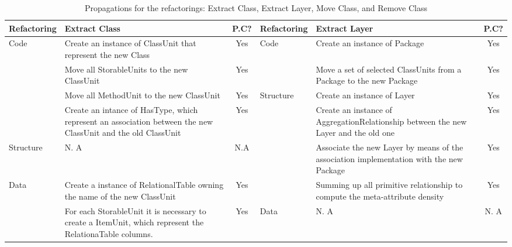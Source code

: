 \begin{table}
\centering
\caption{Propagations for the refactorings: Extract Class, Extract Layer, Move Class, and Remove Class\label{tab:prop}}
{\footnotesize{}}%
\setlength{\tabcolsep}{0.0em}
{\renewcommand{\arraystretch}{0.5}
\begin{tabular}{|l|>{\raggedright}p{7cm}|c|l|>{\raggedright}p{7cm}|c|}
\hline 
\textbf{\footnotesize{\cellcolor{gray!40}Refactoring}} & \textbf{\footnotesize{\cellcolor{gray!40}Extract Class}} & \textbf{\footnotesize{\cellcolor{gray!40}P.C?}} & \textbf{\footnotesize{\cellcolor{gray!40}Refactoring}} & \textbf{\footnotesize{\cellcolor{gray!40}Extract Layer}} & \textbf{\footnotesize{\cellcolor{gray!40}P.C?}}\tabularnewline
\hline 
\hline 
\multirow{4}{*}{{\footnotesize{Code}}} & {\footnotesize{Create an instance of ClassUnit that represent the
new Class}} & {\footnotesize{Yes}} & \multirow{2}{*}{{\footnotesize{Code}}} & {\footnotesize{Create an instance of Package}} & {\footnotesize{Yes}}\tabularnewline
\cline{2-3} \cline{5-6} 
 & {\footnotesize{Move all StorableUnits to the new ClassUnit}} & {\footnotesize{Yes}} &  & {\footnotesize{Move a set of selected ClassUnits from a Package to the
new Package}} & {\footnotesize{Yes}}\tabularnewline
\cline{2-6} 
 & {\footnotesize{Move all MethodUnit to the new ClassUnit}} & {\footnotesize{Yes}} & \multirow{4}{*}{{\footnotesize{Structure}}} & {\footnotesize{Create an instance of Layer}} & {\footnotesize{Yes}}\tabularnewline
\cline{2-3} \cline{5-6} 
 & {\footnotesize{Create an intance of HasType, which represent an association
between the new ClassUnit and the old ClassUnit}} & {\footnotesize{Yes}} &  & {\footnotesize{Create an instance of AggregationRelationship between
the new Layer and the old one}} & {\footnotesize{Yes}}\tabularnewline
\cline{1-3} \cline{5-6} 
{\footnotesize{Structure }} & {\footnotesize{N. A}} & {\footnotesize{N.A}} &  & {\footnotesize{Associate the new Layer by means of the association
implementation with the new Package}} & {\footnotesize{Yes}}\tabularnewline
\cline{1-3} \cline{5-6} 
\multirow{3}{*}{{\footnotesize{Data }}} & {\footnotesize{Create a instance of RelationalTable owning the name
of the new ClassUnit}} & {\footnotesize{Yes}} &  & {\footnotesize{Summing up all primitive relationship to compute the
meta-attribute density}} & {\footnotesize{Yes}}\tabularnewline
\cline{2-6} 
 & {\footnotesize{For each StorableUnit it is necessary to create a ItemUnit,
which represent the RelationaTable columns.}} & {\footnotesize{Yes}} & {\footnotesize{Data}} & {\footnotesize{N. A}} & {\footnotesize{N. A}}\tabularnewline

\end{tabular}}
\end{table}
